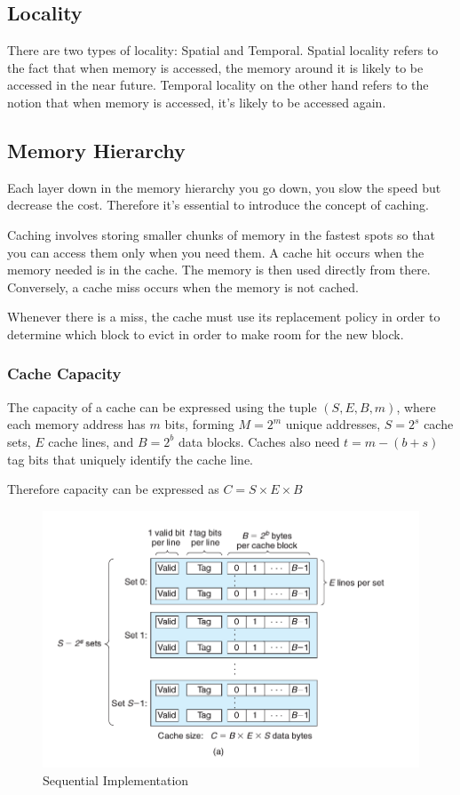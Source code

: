    \subsection{Locality}
    There are two types of locality: Spatial and Temporal. Spatial locality refers to the fact that when memory is accessed, the memory around it is likely to be accessed in the near future. Temporal locality on the other hand refers to the notion that when memory is accessed, it's likely to be accessed again.

    \subsection{Memory Hierarchy}
    Each layer down in the memory hierarchy you go down, you slow the speed but decrease the cost. Therefore it's essential to introduce the concept of caching.

    Caching involves storing smaller chunks of memory in the fastest spots so that you can access them only when you need them. A cache hit occurs when the memory needed is in the cache. The memory is then used directly from there. Conversely, a cache miss occurs when the memory is not cached.

    Whenever there is a miss, the cache must use its replacement policy in order to determine which block to evict in order to make room for the new block.

        \subsubsection{Cache Capacity}
        The capacity of a cache can be expressed using the tuple $(S, E, B, m)$, where each memory address has $m$ bits, forming $M=2^m$ unique addresses, $S=2^s$ cache sets, $E$ cache lines, and $B=2^b$ data blocks. Caches also need $t=m-(b+s)$ tag bits that uniquely identify the cache line.

        Therefore capacity can be expressed as $C = S \times E \times B$

        \begin{figure}[ht]
            \centering
            \includegraphics[scale=0.4]{./img/cache.png}
            \caption{Sequential Implementation}
        \end{figure}

